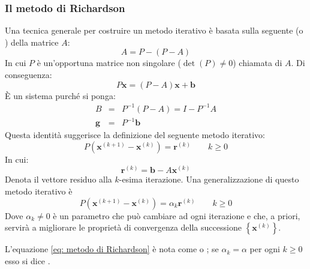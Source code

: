 \subsubsection{Il metodo di Richardson}

Una tecnica generale per costruire un metodo iterativo è basata sulla seguente  (o ) della matrice $A$:
\begin{equation*}
    A = P - \left(P - A\right)
\end{equation*}
In cui $P$ è un'opportuna matrice non singolare ($\det\left(P\right) \ne 0$) chiamata  di $A$. Di conseguenza:
\begin{equation*}
    P\mathbf{x} = \left(P-A\right)\mathbf{x} + \mathbf{b}
\end{equation*}
È un sistema purché si ponga:
\begin{equation*}
    \begin{array}{rcl}
        B &=& P^{-1} \left(P-A\right) = I - P^{-1}A \\
        \mathbf{g} &=& P^{-1}\mathbf{b}
    \end{array}
\end{equation*}
Questa identità suggerisce la definizione del seguente metodo iterativo:
\begin{equation*}
    P\left(\mathbf{x}^{\left(k+1\right)} - \mathbf{x}^{\left(k\right)}\right) = \mathbf{r}^{\left(k\right)} \hspace{2em} k \ge 0
\end{equation*}
In cui:
\begin{equation}
    \mathbf{r}^{\left(k\right)} = \mathbf{b} - A\mathbf{x}^{\left(k\right)}
\end{equation}
Denota il vettore residuo alla $k$-esima iterazione. Una generalizzazione di questo metodo iterativo è
\begin{equation}\label{eq: metodo di Richardson}
    P\left(\mathbf{x}^{\left(k+1\right)} - \mathbf{x}^{\left(k\right)}\right) = \alpha_{k}\mathbf{r}^{\left(k\right)} \hspace{2em} k \ge 0
\end{equation}
Dove $\alpha_{k} \ne 0$ è un parametro che può cambiare ad ogni iterazione e che, a priori, servirà a migliorare le proprietà di convergenza della successione $\left\{\mathbf{x}^{\left(k\right)}\right\}$.

\highspace
L'equazione \ref{eq: metodo di Richardson} è nota come  o ; se $\alpha_{k} = \alpha$ per ogni $k \ge 0$ esso si dice .

